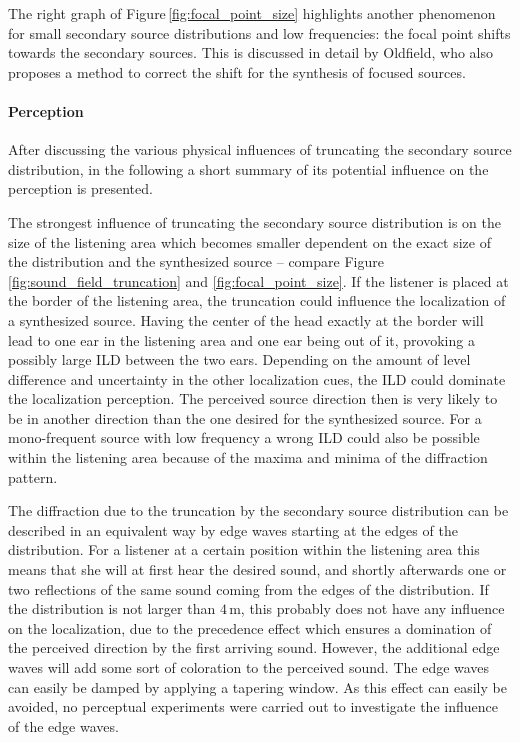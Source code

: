 The right graph of Figure\,\ref{fig:focal_point_size} highlights another phenomenon for small
secondary source distributions and low frequencies: the focal point
shifts towards the secondary sources. This is discussed in detail by
Oldfield,\autocite[][Sect.\,4.9]{Oldfield2013} who also proposes a method to
correct the shift for the synthesis of focused sources.


\paragraph{Perception}
%
After discussing the various physical influences of truncating the secondary
source distribution, in the following a short summary of its potential influence on the
perception is presented.

The strongest influence of truncating the secondary source distribution is on the
size of the listening area which becomes smaller dependent on the exact size of
the distribution and the synthesized source -- compare
Figure\,\ref{fig:sound_field_truncation} and \ref{fig:focal_point_size}.
If the listener is placed at the
border
of the listening area, the truncation could influence the localization of a
synthesized source. Having the center of the head exactly at the border will
lead to one ear in the listening area and one ear being out of it, provoking a
possibly large \ac{ILD} between the two ears. Depending on the amount of level
difference and uncertainty in the other localization cues, the \ac{ILD} could
dominate the localization perception. The perceived source direction then is
very likely to be in another direction than the one desired for the synthesized source.
For a mono-frequent source with low frequency a wrong \ac{ILD} could also be
possible within the listening area because of the maxima and minima of the
diffraction pattern.

The diffraction due to the truncation by the secondary source distribution can
be described in an equivalent way by edge waves starting at the edges of the
distribution. For a listener at a certain position within the
listening area this means that she will at first hear the desired sound, and shortly afterwards
one or two reflections of the same sound coming from the edges of the
distribution. If the distribution is not larger than $4$\,m, this probably does not have
any influence on the localization, due to the precedence
effect\autocite[A good summary is provided in][]{Litovsky1999} which
ensures a domination of the perceived direction by the first arriving sound.
However, the additional edge waves will add some sort of coloration to the perceived
sound.
The edge waves can easily be damped by applying a tapering window.
As this effect can easily be avoided, no perceptual experiments were carried out to
investigate the influence of the edge waves.

